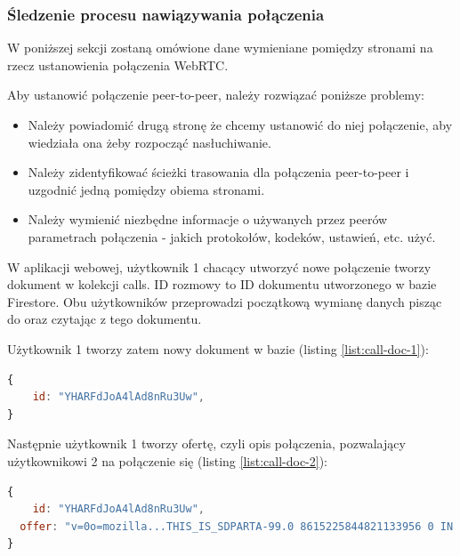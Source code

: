 \subsubsection{Śledzenie procesu nawiązywania połączenia}

W poniższej sekcji zostaną omówione dane wymieniane pomiędzy stronami na rzecz ustanowienia
połączenia WebRTC.

Aby ustanowić połączenie peer-to-peer, należy rozwiązać poniższe problemy: \cite{hpbn}

\begin{itemize}
    \item Należy powiadomić drugą stronę że chcemy ustanowić do niej połączenie, aby wiedziała ona
          żeby rozpocząć nasłuchiwanie.
    \item Należy zidentyfikować ścieżki trasowania dla połączenia peer-to-peer i uzgodnić jedną
          pomiędzy obiema stronami.
    \item Należy wymienić niezbędne informacje o używanych przez peerów parametrach połączenia -
          jakich protokołów, kodeków, ustawień, etc. użyć.
\end{itemize}

W aplikacji webowej, użytkownik 1 chacący utworzyć nowe połączenie tworzy dokument w kolekcji calls.
ID rozmowy to ID dokumentu utworzonego w bazie Firestore. Obu użytkowników przeprowadzi początkową
wymianę danych pisząc do oraz czytając z tego dokumentu.

Użytkownik 1 tworzy zatem nowy dokument w bazie (listing \ref{list:call-doc-1}):

\begin{lstlisting}[language=Javascript,label=list:call-doc-1, caption=Dokument połączenia po utworzeniu przez użytkownika 1,
basicstyle=\footnotesize \ttfamily, showtabs=true, tabsize=4]
{
    id: "YHARFdJoA4lAd8nRu3Uw",
}
\end{lstlisting}

Następnie użytkownik 1 tworzy ofertę, czyli opis połączenia, pozwalający użytkownikowi 2 na
połączenie się (listing \ref{list:call-doc-2}):

\begin{lstlisting}[language=Javascript,label=list:call-doc-2, caption=Dokument połączenia po dodaniu opisu sesji w protokole SDP,
basicstyle=\footnotesize \ttfamily, showtabs=true, tabsize=4]
{
    id: "YHARFdJoA4lAd8nRu3Uw",
  offer: "v=0o=mozilla...THIS_IS_SDPARTA-99.0 8615225844821133956 0 IN IP4 0.0.0.0s=-t=0 0a=fingerprint:sha-256 5F:A8:8A:A5:B8:1D:0C:39:21:93:FA:3A:B2:B7:B6:3F:EF:8A:5D:3C:6E:86:2E:A7:0A:D4:F0:E3:58:E0:E2:7B..."
}
\end{lstlisting}

